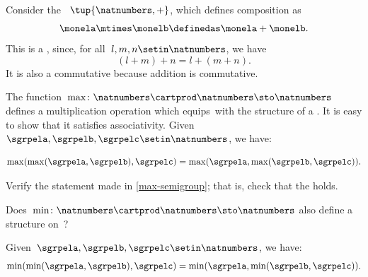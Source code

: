 \begin{example}
    \label{exa:natnum-semigroup}
    Consider the ~$\tup{\natnumbers,+}$, which defines composition as
    \begin{equation}
        \label{eq:natnum-semigroup-definition}
        \monela \mtimes \monelb \definedas \monela + \monelb.
    \end{equation}
    This is a , since, for all~$l,m, n \setin \natnumbers$, we have
    \begin{equation}
        (l+m)
        +n = l+(m+n).
    \end{equation}
    It is also a commutative  because addition is commutative.
\end{example}

\begin{example}
    \label{max-semigroup}

    The function~$\max \colon \natnumbers \cartprod \natnumbers \sto \natnumbers$ defines a multiplication operation which equips~\natnumbers with the structure of a .
    It is easy to show that it satisfies associativity.
    Given~$\sgrpela,\sgrpelb,\sgrpelc\setin \natnumbers$, we have:

    \begin{equation}
        \label{eq:max-assoc}
        \max(\max(\sgrpela,\sgrpelb),\sgrpelc)
        =
        \max(\sgrpela,\max(\sgrpelb,\sgrpelc)).
    \end{equation}
\end{example}

\begin{exercise}
    \label{ex:max-semigroup}
    Verify the statement made in \cref{max-semigroup}; that is, check that the  holds.

    Does~$\min \colon \natnumbers \cartprod \natnumbers \sto \natnumbers$ also define a  structure on~\natnumbers ?
\end{exercise}
\begin{solution}
    Given~$\sgrpela,\sgrpelb,\sgrpelc\setin \natnumbers$, we have:
    \begin{equation}
        \label{eq:min-assoc}
        \min(\min(\sgrpela,\sgrpelb),\sgrpelc)=\min(\sgrpela,\min(\sgrpelb,\sgrpelc)).
    \end{equation}
\end{solution}




